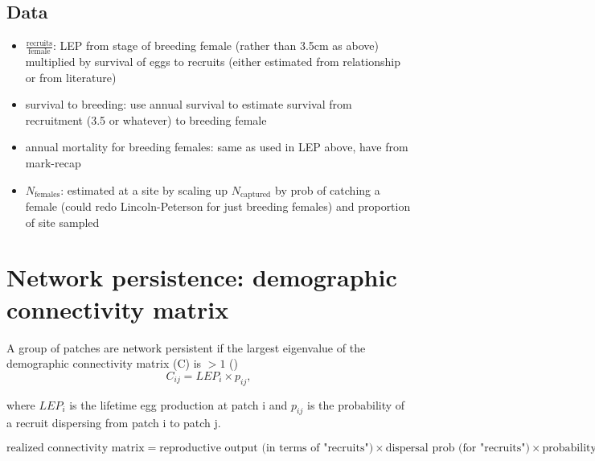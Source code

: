 \documentclass[12pt, oneside]{article}   	%
\begin{document}
\subsection*{Data}
\begin{itemize}
	\item $\frac{\text{recruits}}{\text{female}}$: LEP from stage of breeding female (rather than 3.5cm as above) multiplied by survival of eggs to recruits (either estimated from relationship or from literature)
	\item survival to breeding: use annual survival to estimate survival from recruitment (3.5 or whatever) to breeding female
	\item annual mortality for breeding females: same as used in LEP above, have from mark-recap
	\item $N_{\text{females}}$: estimated at a site by scaling up $N_{\text{captured}}$ by prob of catching a female (could redo Lincoln-Peterson for just breeding females) and proportion of site sampled
	\end{itemize}

\section*{Network persistence: demographic connectivity matrix}
A group of patches are network persistent if the largest eigenvalue of the demographic connectivity matrix (C) is $ > 1$ (\cite{burgess2014beyond,lyselpopulation})
\begin{equation}
C_{ij} = LEP_i \times p_{ij},
\end{equation}

where $LEP_i$ is the lifetime egg production at patch i and $p_{ij}$ is the probability of a recruit dispersing from patch i to patch j.

\begin{equation}
\text{realized connectivity matrix} = \text{reproductive output (in terms of "recruits")} \times \text{dispersal prob (for "recruits")} \times \text{probability of survival to maturity for females}
\end{equation}

\end{document}
